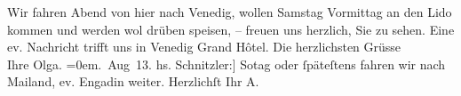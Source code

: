 \begin{ledgroupsized}[t]{13cm}
           \pstart
           {\pb}Wir fahren \label{KLL02149_Beer-Hofmann-Beer-HofmannP-1v}\label{KLL02149_Beer-Hofmann-Beer-HofmannP-1h}{ }Abend von hier nach Venedig, wollen
                  Samstag{ }Vormittag an den Lido kommen und werden
               wol drüben speisen, – freuen uns herzlich, Sie zu sehen. Eine ev. Nachricht trifft
               uns in Venedig Grand Hôtel.\pend
           \pstart
           Die herzlichsten Grüsse{\\[\baselineskip]}Ihre \spacefill\mbox{Olga.}\pend
           \leftskip=0em{}. Aug 13.\pend
           \pstart
           \noindent{}{\pb}{[}hs. Schnitzler:{]} So{\geminationn}tag oder ſpäteſtens \label{KLL02149_Beer-Hofmann-Beer-HofmannP-2v}\label{KLL02149_Beer-Hofmann-Beer-HofmannP-2h} fahren wir nach Mailand, ev. Engadin weiter.\pend
           \pstart Herzlichſt Ihr \spacefill\mbox{A.}\pend{}\endnumbering{}\end{ledgroupsized}  \newcommand{\dateiname}{L02149}\newcommand{\titel}{Olga und Arthur Schnitzler an Richard und Paula Beer-Hofmann, 20. 8. 1913}\newcommand{\editorInnen}{Martin Anton Müller und Gerd-Hermann Susen}
            \footnotesize
\begin{ledgroupsized}[t]{11.5cm}
\end{ledgroupsized}
         
      